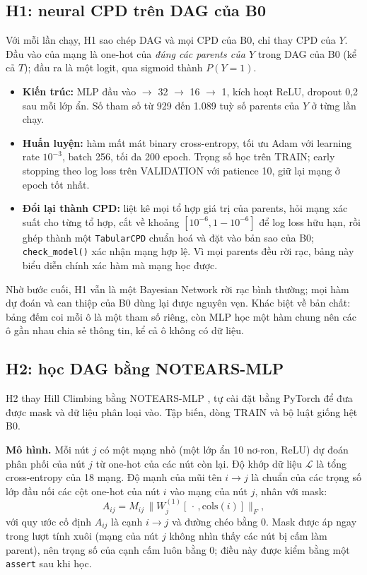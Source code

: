 \documentclass[pdflatex,sn-mathphys-num]{sn-jnl}%
\begin{document}
\subsection{H1: neural CPD trên DAG của B0}\label{sec:h1}

Với mỗi lần chạy, H1 sao chép DAG và mọi CPD của B0, chỉ thay CPD của $Y$. Đầu vào của mạng là one-hot của \emph{đúng các parents của $Y$} trong DAG của B0 (kể cả $T$); đầu ra là một logit, qua sigmoid thành $P(Y{=}1)$.

\begin{itemize}
\item \textbf{Kiến trúc:} MLP đầu vào $\to$ 32 $\to$ 16 $\to$ 1, kích hoạt ReLU, dropout 0,2 sau mỗi lớp ẩn. Số tham số từ 929 đến 1.089 tuỳ số parents của $Y$ ở từng lần chạy.
\item \textbf{Huấn luyện:} hàm mất mát binary cross-entropy, tối ưu Adam \cite{kingma2015} với learning rate $10^{-3}$, batch 256, tối đa 200 epoch. Trọng số học trên TRAIN; early stopping theo log loss trên VALIDATION với patience 10, giữ lại mạng ở epoch tốt nhất.
\item \textbf{Đổi lại thành CPD:} liệt kê mọi tổ hợp giá trị của parents, hỏi mạng xác suất cho từng tổ hợp, cắt về khoảng $[10^{-6}, 1-10^{-6}]$ để log loss hữu hạn, rồi ghép thành một \texttt{TabularCPD} chuẩn hoá và đặt vào bản sao của B0; \texttt{check\_model()} xác nhận mạng hợp lệ. Vì mọi parents đều rời rạc, bảng này biểu diễn chính xác hàm mà mạng học được.
\end{itemize}

Nhờ bước cuối, H1 vẫn là một Bayesian Network rời rạc bình thường; mọi hàm dự đoán và can thiệp của B0 dùng lại được nguyên vẹn. Khác biệt về bản chất: bảng đếm coi mỗi ô là một tham số riêng, còn MLP học một hàm chung nên các ô gần nhau chia sẻ thông tin, kể cả ô không có dữ liệu.

\subsection{H2: học DAG bằng NOTEARS-MLP}\label{sec:h2}

H2 thay Hill Climbing bằng NOTEARS-MLP \cite{zheng2020}, tự cài đặt bằng PyTorch \cite{paszke2019} để đưa được mask và dữ liệu phân loại vào. Tập biến, dòng TRAIN và bộ luật giống hệt B0.

\textbf{Mô hình.} Mỗi nút $j$ có một mạng nhỏ (một lớp ẩn 10 nơ-ron, ReLU) dự đoán phân phối của nút $j$ từ one-hot của các nút còn lại. Độ khớp dữ liệu $\mathcal{L}$ là tổng cross-entropy của 18 mạng. Độ mạnh của mũi tên $i \to j$ là chuẩn của các trọng số lớp đầu nối các cột one-hot của nút $i$ vào mạng của nút $j$, nhân với mask:
\begin{equation}\label{eq:adj}
A_{ij} = M_{ij}\,\big\lVert W^{(1)}_{j}[\,\cdot\,, \mathrm{cols}(i)] \big\rVert_F ,
\end{equation}
với quy ước cố định $A_{ij}$ là cạnh $i \to j$ và đường chéo bằng 0. Mask được áp ngay trong lượt tính xuôi (mạng của nút $j$ không nhìn thấy các nút bị cấm làm parent), nên trọng số của cạnh cấm luôn bằng 0; điều này được kiểm bằng một \texttt{assert} sau khi học.
\end{document}
